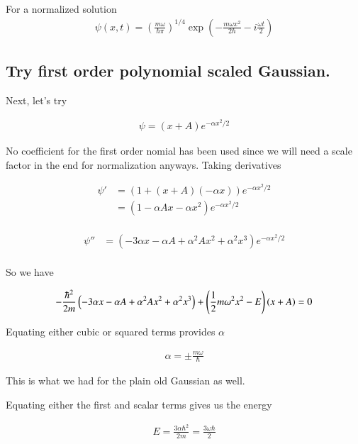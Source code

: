 For a normalized solution
\begin{align}
\psi(x,t) = \left( 
\frac{ m \omega }{\hbar \pi}
\right)^{1/4} \exp\left( - \frac{m \omega x^2 }{2 \hbar} - i \frac{\omega t}{2} \right)
\end{align}

\subsection{Try first order polynomial scaled Gaussian. }

Next, let's try 

\begin{align*}
\psi = (x + A) e^{-\alpha x^2/2}
\end{align*}

No coefficient for the first order nomial has been used since we will need a scale factor in the end for normalization anyways.  Taking derivatives

\begin{align*}
\psi' 
&= (1 + (x + A)(-\alpha x)) e^{-\alpha x^2/2} \\
&= (1 - \alpha A x - \alpha x^2 ) e^{-\alpha x^2/2} \\
\end{align*}

\begin{align*}
\psi'' 
&= 
\left( - 3 \alpha x - \alpha A + \alpha^2 A x^2 + \alpha^2 x^3 \right) e^{-\alpha x^2/2} \\
\end{align*}

So we have

\begin{align*}
-\frac{\hbar^2}{2m}\left( - 3 \alpha x - \alpha A + \alpha^2 A x^2 + \alpha^2 x^3 \right) 
+ \left( \frac{1}{2}m \omega^2 x^2 - E \right) (x + A) = 0
\end{align*}

Equating either cubic or squared terms provides $\alpha$

\begin{align*}
\alpha = \pm \frac{m \omega}{\hbar}
\end{align*}

This is what we had for the plain old Gaussian as well.

Equating either the first and scalar terms gives us the energy 

\begin{align*}
E = \frac{3 \alpha \hbar^2}{2m} = \frac{3 \omega \hbar}{2}
\end{align*}

